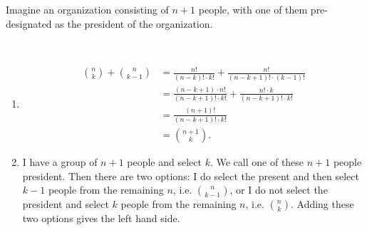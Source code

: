 
\setcounter{theorem}{15}
\begin{exercise}[BH.1.16]
\begin{hint}
	Imagine an organization consisting of $n + 1$ people, with one of them pre-designated as the president of the organization.
\end{hint}
\begin{solution}~
	\begin{enumerate}
		\item \begin{align*}
	 		{n \choose k} + {n \choose k-1} &= \frac{n!}{(n-k)!\cdot k!} + \frac{n!}{(n-k+1)!\cdot (k-1)!}\\
	 		&= \frac{(n-k+1)\cdot n!}{(n-k+1)!\cdot k!} +  \frac{n!\cdot k}{(n-k+1)!\cdot k!}\\
	 		& = \frac{(n+1)!}{(n-k+1)!\cdot k!}\\
	 		& = {n+1\choose k}.
	 	\end{align*}
	 	\item I have a group of $n+1$ people and select $k$. We call one of these $n+1$ people president. Then there are two options: I do select the present and then select $k-1$ people from the remaining $n$, i.e. ${n \choose k-1}$, or I do not select the president and select $k$ people from the remaining $n$, i.e. ${n \choose k}$. Adding these two options gives the left hand side.
	\end{enumerate}
\end{solution}
\end{exercise}


